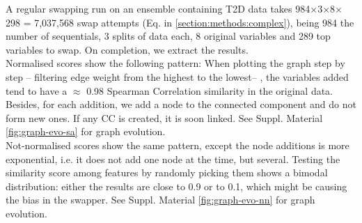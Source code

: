A regular swapping run on an ensemble containing T2D data takes 984$\times$3$\times$8$\times$298 = 7,037,568 swap attempts (Eq. in \ref{section:methods:complex}), being 984 the number of sequentials, 3 splits of data each, 8 original variables and 289 top variables to swap.
On completion, we extract the results.
\\

Normalised scores show the following pattern: When plotting the graph step by step -- filtering edge weight from the highest to the lowest-- , the variables added tend to have a $\approx$ 0.98 Spearman Correlation similarity in the original data. Besides, for each addition, we add a node to the connected component and do not form new ones. If any CC is created, it is soon linked. See Suppl. Material \ref{fig:graph-evo-sa} for graph evolution.
\\

Not-normalised scores show the same pattern, except the node additions is more exponential, i.e. it does not add one node at the time, but several.
Testing the similarity score among features by randomly picking them shows a bimodal distribution: either the results are close to 0.9 or to 0.1, which might be causing the bias in the swapper. See Suppl. Material \ref{fig:graph-evo-nn} for graph evolution.
\\

